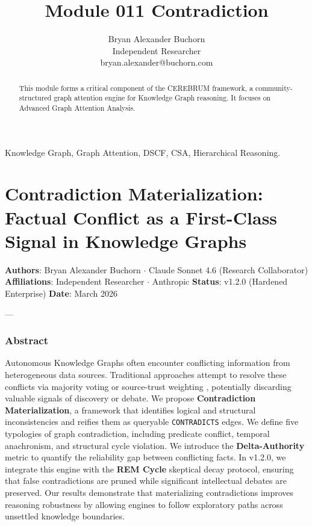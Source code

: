\documentclass[10pt,journal,compsoc]{IEEEtran}
\begin{document}
\title{Module 011 Contradiction}
\author{Bryan Alexander Buchorn \\ Independent Researcher \\ bryan.alexander@buchorn.com}

\maketitle

\begin{abstract}
This module forms a critical component of the CEREBRUM framework, a community-structured graph attention engine for Knowledge Graph reasoning. It focuses on Advanced Graph Attention Analysis.
\end{abstract}

\begin{IEEEkeywords}
Knowledge Graph, Graph Attention, DSCF, CSA, Hierarchical Reasoning.
\end{IEEEkeywords}

\section{Contra\-diction Materi\-alization: Factual Conflict as a First-Class Signal in Knowledge Graphs}

\textbf{Authors}: Bryan Alexander Buchorn $\cdot$ Claude Sonnet 4.6 (Research Collab\-orator)  
\textbf{Affili\-ations}: Independent Researcher $\cdot$ Anthropic  
\textbf{Status}: v1.2.0 (Hardened Enterprise)  
\textbf{Date}: March 2026

---

\subsubsection{Abstract}
Autonomous Knowledge Graphs often encounter conflicting information from heter\-ogeneous data sources. Traditional approaches attempt to resolve these conflicts via majority voting or source-trust weighting \cite{dong2014knowledgevault, bertossi2011database}, potentially discarding valuable signals of discovery or debate. We propose \textbf{Contra\-diction Materi\-alization}, a framework that identifies logical and structural incon\-sistencies and reifies them as queryable \texttt{CONTRADICTS} edges. We define five typologies of graph contr\-adiction, including predicate conflict, temporal anachronism, and structural cycle violation. We introduce the \textbf{Delta-Authority} metric to quantify the reliability gap between conflicting facts. In v1.2.0, we integrate this engine with the \textbf{REM Cycle} skeptical decay protocol, ensuring that false contr\-adictions are pruned while significant intel\-lectual debates are preserved. Our results demonstrate that mater\-ializing contr\-adictions improves reasoning robustness by allowing engines to follow exploratory paths across unsettled knowledge boundaries.
\end{document}
